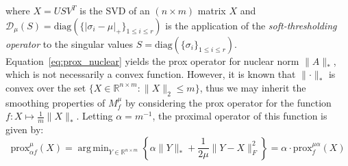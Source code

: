 \documentclass[10pt]{article}
\DeclareMathOperator*{\argmin}{arg\,min}
\begin{document}
where $X = U S V^T$ is the SVD of an $(n \times m)$ matrix $X$ and $\mathcal{D}_\mu(S) = \mathrm{diag}(\{ \lvert \sigma_i - \mu \rvert_{+} \}_{1 \leq i \leq r} )$ is the application of the \emph{soft-thresholding operator} to the singular values  $S = \mathrm{diag}(\{ \sigma_i \}_{1 \leq i \leq r})$.  
Equation~\eqref{eq:prox_nuclear} yields the prox operator for nuclear norm $\lVert A \rVert_\ast$, which is not necessarily a convex function. However, it is known that $\lVert \cdot \rVert_\ast$ is convex over the set $\{ X \in \mathbb{R}^{n \times m} : \lVert X \rVert_2 \leq m \} $, thus we may inherit the smoothing properties of $M_f^\mu$ by considering the prox operator for the function $f: X \mapsto \frac{1}{m} \lVert X \rVert_\ast$. Letting $\alpha = m^{-1}$, the proximal operator of this function is given by: 
\begin{equation}
	\mathrm{prox}_{\alpha f}^\mu(X) = \argmin_{Y \in \mathbb{R}^{n \times m}} \left \{ \alpha \lVert Y \rVert_\ast  + \frac{1}{2\mu}\lVert Y - X \rVert_F^2 \right \} = \alpha \cdot \mathrm{prox}_f^{\mu \alpha}(X)
\end{equation}

\end{document}
